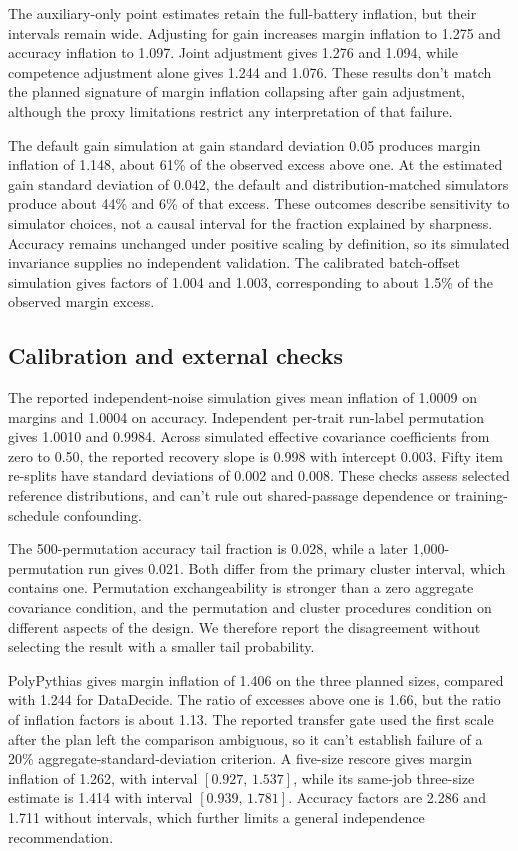 \documentclass{article}
\newcommand{\ci}[2]{\ensuremath{[#1,\,#2]}}
\begin{document}
The auxiliary-only point estimates retain the full-battery inflation, but their intervals remain wide. Adjusting for gain increases margin inflation to 1.275 and accuracy inflation to 1.097. Joint adjustment gives 1.276 and 1.094, while competence adjustment alone gives 1.244 and 1.076. These results don't match the planned signature of margin inflation collapsing after gain adjustment, although the proxy limitations restrict any interpretation of that failure.

The default gain simulation at gain standard deviation 0.05 produces margin inflation of 1.148, about 61\% of the observed excess above one. At the estimated gain standard deviation of 0.042, the default and distribution-matched simulators produce about 44\% and 6\% of that excess. These outcomes describe sensitivity to simulator choices, not a causal interval for the fraction explained by sharpness. Accuracy remains unchanged under positive scaling by definition, so its simulated invariance supplies no independent validation. The calibrated batch-offset simulation gives factors of 1.004 and 1.003, corresponding to about 1.5\% of the observed margin excess.

\subsection{Calibration and external checks}
The reported independent-noise simulation gives mean inflation of 1.0009 on margins and 1.0004 on accuracy. Independent per-trait run-label permutation gives 1.0010 and 0.9984. Across simulated effective covariance coefficients from zero to 0.50, the reported recovery slope is 0.998 with intercept 0.003. Fifty item re-splits have standard deviations of 0.002 and 0.008. These checks assess selected reference distributions, and can't rule out shared-passage dependence or training-schedule confounding.

The 500-permutation accuracy tail fraction is 0.028, while a later 1,000-permutation run gives 0.021. Both differ from the primary cluster interval, which contains one. Permutation exchangeability is stronger than a zero aggregate covariance condition, and the permutation and cluster procedures condition on different aspects of the design. We therefore report the disagreement without selecting the result with a smaller tail probability.

PolyPythias gives margin inflation of 1.406 on the three planned sizes, compared with 1.244 for DataDecide. The ratio of excesses above one is 1.66, but the ratio of inflation factors is about 1.13. The reported transfer gate used the first scale after the plan left the comparison ambiguous, so it can't establish failure of a 20\% aggregate-standard-deviation criterion. A five-size rescore gives margin inflation of 1.262, with interval \ci{0.927}{1.537}, while its same-job three-size estimate is 1.414 with interval \ci{0.939}{1.781}. Accuracy factors are 2.286 and 1.711 without intervals, which further limits a general independence recommendation.
\end{document}
